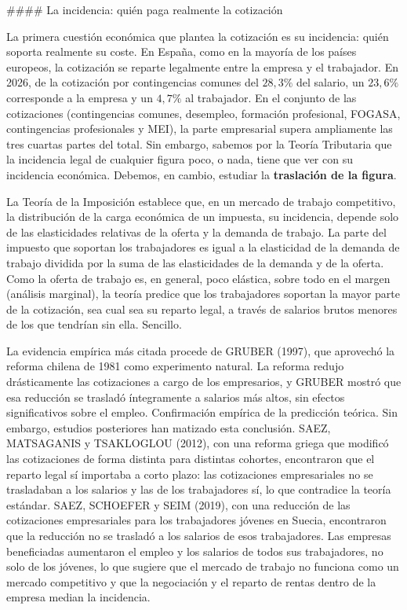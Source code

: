 \documentclass[10pt,a4paper]{article}
\begin{document}
#### La incidencia: quién paga realmente la cotización

La primera cuestión económica que plantea la cotización es su incidencia: quién soporta realmente su coste. En España, como en la mayoría de los países europeos, la cotización se reparte legalmente entre la empresa y el trabajador. En 2026, de la cotización por contingencias comunes del $28,3\%$ del salario, un $23,6\%$ corresponde a la empresa y un $4,7\%$ al trabajador. En el conjunto de las cotizaciones (contingencias comunes, desempleo, formación profesional, FOGASA, contingencias profesionales y MEI), la parte empresarial supera ampliamente las tres cuartas partes del total. Sin embargo, sabemos por la Teoría Tributaria que la incidencia legal de cualquier figura poco, o nada, tiene que ver con su incidencia económica. Debemos, en cambio, estudiar la \textbf{traslación de la figura}.

La Teoría de la Imposición establece que, en un mercado de trabajo competitivo, la distribución de la carga económica de un impuesta, su incidencia, depende solo de las elasticidades relativas de la oferta y la demanda de trabajo. La parte del impuesto que soportan los trabajadores es igual a la elasticidad de la demanda de trabajo dividida por la suma de las elasticidades de la demanda y de la oferta. Como la oferta de trabajo es, en general, poco elástica, sobre todo en el margen (análisis marginal), la teoría predice que los trabajadores soportan la mayor parte de la cotización, sea cual sea su reparto legal, a través de salarios brutos menores de los que tendrían sin ella. Sencillo.

La evidencia empírica más citada procede de GRUBER (1997), que aprovechó la reforma chilena de 1981 como experimento natural. La reforma redujo drásticamente las cotizaciones a cargo de los empresarios, y GRUBER mostró que esa reducción se trasladó íntegramente a salarios más altos, sin efectos significativos sobre el empleo. Confirmación empírica de la predicción teórica. Sin embargo, estudios posteriores han matizado esta conclusión. SAEZ, MATSAGANIS y TSAKLOGLOU (2012), con una reforma griega que modificó las cotizaciones de forma distinta para distintas cohortes, encontraron que el reparto legal sí importaba a corto plazo: las cotizaciones empresariales no se trasladaban a los salarios y las de los trabajadores sí, lo que contradice la teoría estándar. SAEZ, SCHOEFER y SEIM (2019), con una reducción de las cotizaciones empresariales para los trabajadores jóvenes en Suecia, encontraron que la reducción no se trasladó a los salarios de esos trabajadores. Las empresas beneficiadas aumentaron el empleo y los salarios de todos sus trabajadores, no solo de los jóvenes, lo que sugiere que el mercado de trabajo no funciona como un mercado competitivo y que la negociación y el reparto de rentas dentro de la empresa median la incidencia. 
\end{document}
